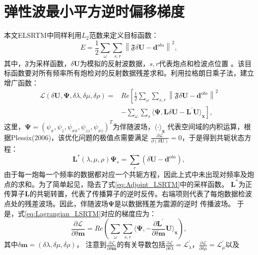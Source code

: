 \section{弹性波最小平方逆时偏移梯度}
本文ELSRTM中同样利用$L_2$范数来定义目标函数：
\begin{equation}
    E=\frac{1}{2}\sum_{\omega}\sum_{s,r}\left\lVert \mathfrak{F}\delta \mathbf{U}-\mathbf{d}^{obs} \right \rVert^2,
    \label{eq:misfit_LSRTM}
\end{equation}
其中，$\mathfrak{F}$为采样函数，$\delta\mathbf{U}$为模拟的反射波数据，$s,r$代表炮点和检波点位置
。该目标函数要对所有频率所有炮检对的反射数据残差求和。利用拉格朗日乘子法，建立增广函数：
\begin{equation}
\begin{split}
    \mathcal{L}(\delta\mathbf{U},\bm\Psi,\delta\lambda,\delta\mu,\delta\rho)=&Re\left[
	\frac{1}{2}\sum_{\omega}\sum_{s,r}\left\lVert \mathfrak{F}\delta \mathbf{U}-\mathbf{d}^{obs} \right \rVert^2 \right. \\
	&\left.-\sum_{\omega}\sum_{s}\langle\bm\Psi,\mathbf{L}\delta\mathbf{U}-\mathbf{L}^{'}\mathbf{U}\rangle_{\mathbf{x}}\right],
    \label{eq:Lagrangian_LSRTM}
\end{split}
\end{equation}
这里，$\bm\Psi=(\psi_x,\psi_z,\psi_{xx},\psi_{zz},\psi_{xz})^T$为伴随波场，$\langle\cdot\rangle_\mathbf{x}$
代表空间域的内积运算，根据Plessix(2006)\cite{plessix2006}，该优化问题的极值点需要满足
$\frac{\partial\mathcal{L}}{\partial(\delta\mathbf{U})}=0$，于是得到共轭状态方程：
\begin{equation}
	\mathbf{L}^*(\lambda,\mu,\rho)\bm\Psi_s=\sum_{r}(\delta\mathbf{U}-\mathbf{d}^{obs}),
    \label{eq:Adjoint_LSRTM} 
\end{equation}
由于每一炮每一个频率的数据都对应一个共轭方程，因此上式中未出现对频率及炮点的求和。为了简单起见，隐去了式\eqref{eq:Adjoint_LSRTM}中的采样函数。
$\mathbf{L}^*$为正传算子$\mathbf{L}$的共轭转置，代表了传播算子的逆时反传。右端项则代表了每炮数据检波点处的残差波场。因此，伴随波场$\bm\Psi$是以数据残差为震源的逆时
传播波场。
于是，式\eqref{eq:Lagrangian_LSRTM}对应的梯度应为：
\begin{equation}
    \frac{\partial\mathcal{L}}{\partial \delta\mathbf{m}}=Re\left(\sum_{\omega}\sum_{s,r}
	\langle\bm\Psi,-\frac{\partial
		\mathbf{L}^{'}}{\partial\delta\mathbf{m}}\mathbf{U}\rangle_{\mathbf{x}}\right),
    \label{eq:Gradient_LSRTM}
\end{equation}
其中$\delta\mathbf{m}=(\delta\lambda, \delta\mu,\delta\rho)$，
注意到$\frac{\partial\mathcal{L}}{\partial \delta\mathbf{m}}$的有关导数包括$\frac{\partial\mathcal{L}}{\partial 
\delta\lambda}=\mathcal{L}^{'}_{\lambda}$，$\frac{\partial\mathcal{L}}{\partial\delta\mu}=\mathcal{L}^{'}_{\mu}$以及
